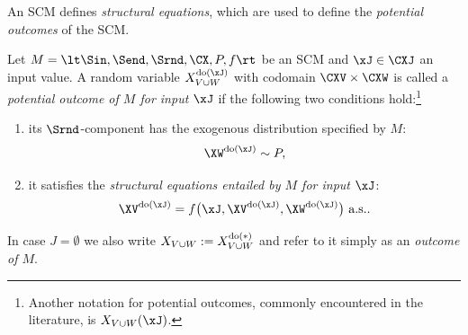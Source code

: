 An SCM defines \emph{structural equations}, which are used to define the \emph{potential outcomes} of the SCM.
\begin{Def}\label{def:scm_solutions_for_inputs}
  Let $M = \lt \Sin, \Send, \Srnd, \CX, P, f \rt$ be an SCM
  and $\xJ \in \CXJ$ an input value.
  A random variable $X_{V \cup W}^{\doit(\xJ)}$ with codomain $\CXV \times \CXW$ is called
  a \emph{potential outcome of $M$ for input $\xJ$} 
  if the following two conditions hold:\footnote{Another notation for potential outcomes, commonly encountered in the literature, is $X_{V\cup W}(\xJ)$.}
    \begin{enumerate}
      \item its $\Srnd$-component has the exogenous distribution specified by $M$: 
        $$\XW^{\doit(\xJ)} \sim P,$$
      \item it satisfies the \emph{structural equations entailed by $M$ for input $\xJ$}:
        \begin{equation}\label{eq:cscm_structural_equations}
          \XV^{\doit(\xJ)} = f\big(\xJ, \XV^{\doit(\xJ)}, \XW^{\doit(\xJ)}\big) \text{ a.s.}.
        \end{equation}
    \end{enumerate}
  In case $J = \emptyset$ we also write $X_{V \cup W} := X_{V \cup W}^{\operatorname{do}(*)}$ and refer to it simply as an \emph{outcome of $M$}.
\end{Def}

